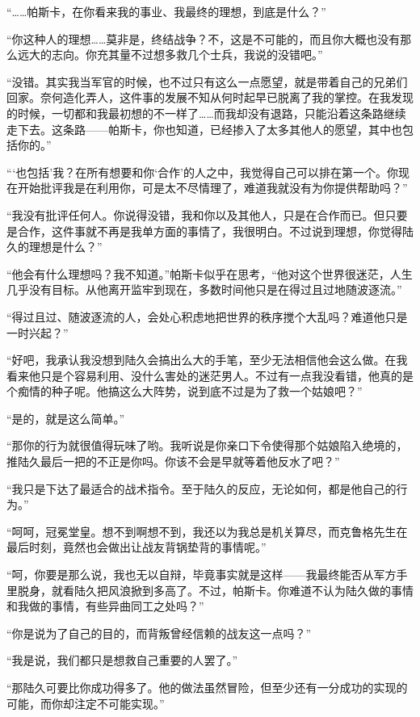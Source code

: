 “……帕斯卡，在你看来我的事业、我最终的理想，到底是什么？”

“你这种人的理想……莫非是，终结战争？不，这是不可能的，而且你大概也没有那么远大的志向。你充其量不过想多救几个士兵，我说的没错吧。”

“没错。其实我当军官的时候，也不过只有这么一点愿望，就是带着自己的兄弟们回家。奈何造化弄人，这件事的发展不知从何时起早已脱离了我的掌控。在我发现的时候，一切都和我最初想的不一样了……而我却没有退路，只能沿着这条路继续走下去。这条路——帕斯卡，你也知道，已经掺入了太多其他人的愿望，其中也包括你的。”

“‘也包括’我？在所有想要和你‘合作’的人之中，我觉得自己可以排在第一个。你现在开始批评我是在利用你，可是太不尽情理了，难道我就没有为你提供帮助吗？”

“我没有批评任何人。你说得没错，我和你以及其他人，只是在合作而已。但只要是合作，这件事就不再是我单方面的事情了，我很明白。不过说到理想，你觉得陆久的理想是什么？”

“他会有什么理想吗？我不知道。”帕斯卡似乎在思考，“他对这个世界很迷茫，人生几乎没有目标。从他离开监牢到现在，多数时间他只是在得过且过地随波逐流。”

“得过且过、随波逐流的人，会处心积虑地把世界的秩序搅个大乱吗？难道他只是一时兴起？”

“好吧，我承认我没想到陆久会搞出么大的手笔，至少无法相信他会这么做。在我看来他只是个容易利用、没什么害处的迷茫男人。不过有一点我没看错，他真的是个痴情的种子呢。他搞这么大阵势，说到底不过是为了救一个姑娘吧？”

“是的，就是这么简单。”

“那你的行为就很值得玩味了哟。我听说是你亲口下令使得那个姑娘陷入绝境的，推陆久最后一把的不正是你吗。你该不会是早就等着他反水了吧？”

“我只是下达了最适合的战术指令。至于陆久的反应，无论如何，都是他自己的行为。”

“呵呵，冠冕堂皇。想不到啊想不到，我还以为我总是机关算尽，而克鲁格先生在最后时刻，竟然也会做出让战友背锅垫背的事情呢。”

“呵，你要是那么说，我也无以自辩，毕竟事实就是这样——我最终能否从军方手里脱身，就看陆久把风浪掀到多高了。不过，帕斯卡。你难道不认为陆久做的事情和我做的事情，有些异曲同工之处吗？”

“你是说为了自己的目的，而背叛曾经信赖的战友这一点吗？”

“我是说，我们都只是想救自己重要的人罢了。”

“那陆久可要比你成功得多了。他的做法虽然冒险，但至少还有一分成功的实现的可能，而你却注定不可能实现。”

